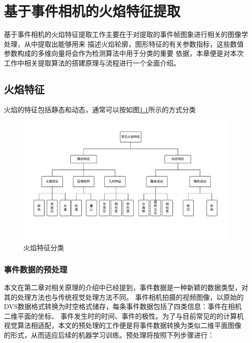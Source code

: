 
\chapter{基于事件相机的火焰特征提取}
基于事件相机的火焰特征提取工作主要在于对提取的事件帧图象进行相关的图像学处理，从中提取出能够用来
描述火焰轮廓，图形特征的有关参数指标，这些数值参数构成的多维向量将会作为检测算法中用于分类的重要
依据，本章便是对本次工作中相关提取算法的搭建原理与流程进行一个全面介绍。

\section{火焰特征}
火焰的特征包括静态和动态，通常可以按如图\ref{5}所示的方式分类
\begin{figure}
    \centering
    \includegraphics[width=\textwidth]{figures/extract_characteristic.pdf}
    \caption{火焰特征分类}
    \label{5}
\end{figure}

\subsection{事件数据的预处理}
本文在第二章对相关原理的介绍中已经提到，事件数据是一种新颖的数据类型，对其的处理方法也与传统视觉处理方法不同。
事件相机拍摄的视频图像，以原始的DVS数据格式转换为时空格式储存，每条事件数据包括了四类信息：事件在相机二维平面的坐标、
事件发生时的时间、事件的极性。为了与目前常见的的计算机视觉算法相适配，本文的预处理的工作便是将事件数据转换为类似二维平面图像
的形式，从而适应后续的机器学习训练。预处理将按照下列步骤进行：

